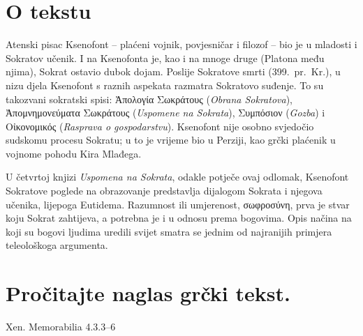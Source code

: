 


\section*{O tekstu}

Atenski pisac Ksenofont – plaćeni vojnik, povjesničar i filozof – bio je u mladosti i Sokratov učenik. I na Ksenofonta je, kao i na mnoge druge (Platona među njima), Sokrat ostavio dubok dojam. Poslije Sokratove smrti (399.\ pr.~Kr.), u nizu djela Ksenofont s raznih aspekata razmatra Sokratovo suđenje. To su takozvani sokratski spisi: \textgreek[variant=ancient]{Ἀπολογία Σωκράτους} (\textit{Obrana Sokratova}), \textgreek[variant=ancient]{Ἀπομνημονεύματα Σωκράτους} (\textit{Uspomene na Sokrata}), \textgreek[variant=ancient]{Συμπόσιον} (\textit{Gozba}) i \textgreek[variant=ancient]{Οἰκονομικός} (\textit{Rasprava o gospodarstvu}). Ksenofont nije osobno svjedočio sudskomu procesu Sokratu; u to je vrijeme bio u Perziji, kao grčki plaćenik u vojnome pohodu Kira Mlađega.

U četvrtoj knjizi \textit{Uspomena na Sokrata}, odakle potječe ovaj odlomak, Ksenofont Sokratove poglede na obrazovanje predstavlja dijalogom Sokrata i njegova učenika, lijepoga Eutidema. Razumnost ili umjerenost, \textgreek[variant=ancient]{σωφροσύνη,} prva je stvar koju Sokrat zahtijeva, a potrebna je i u odnosu prema bogovima. Opis načina na koji su bogovi ljudima uredili svijet smatra se jednim od najranijih primjera teleološkoga argumenta.

\newpage

\section*{Pročitajte naglas grčki tekst.}

Xen. Memorabilia 4.3.3–6


\medskip


